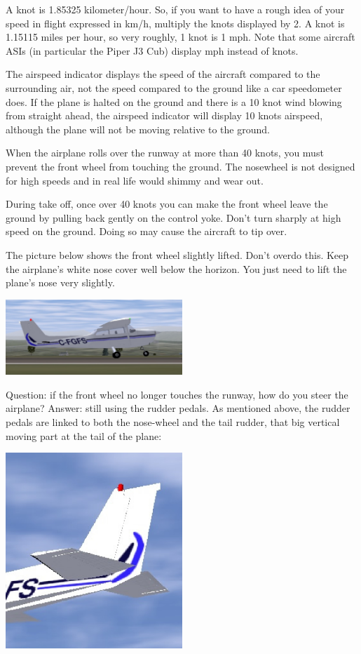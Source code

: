 A knot is 1.85325
kilometer/hour. So, if you want to have a rough idea of your speed in
flight expressed in km/h, multiply the knots displayed by 2. A knot is
1.15115 miles per hour, so very roughly, 1 knot is 1 mph. Note that some
aircraft ASIs (in particular the Piper J3 Cub) display mph instead of knots.

The airspeed indicator displays the speed of the aircraft compared
to the surrounding air, not the speed compared to the ground like a car
speedometer does. If the plane is halted on the ground and there is
a 10 knot wind blowing from straight ahead, the airspeed indicator will
display 10 knots airspeed, although the plane will not be moving relative to
the ground.

When the airplane rolls over the runway at more than 40 knots, you must
prevent the front wheel from touching the ground. The nosewheel is not designed
for high speeds and in real life would shimmy and wear out.

During take off, once over 40 knots you can make the front wheel leave the ground by pulling back
gently on the control yoke. Don't turn sharply at high speed on the ground. 
Doing so may cause the aircraft to tip over. 

The picture below shows the front wheel slightly lifted. Don't overdo
this. Keep the airplane's white nose cover well below the horizon. You
just need to lift the plane's nose very slightly.

\begin{center}
\includegraphics[width=0.5\textwidth]{img/tut_25}
\end{center}

Question: if the front wheel no longer touches the runway, how do you
steer the airplane? Answer: still using the rudder pedals. As mentioned above, 
the rudder pedals are linked to both the nose-wheel and the tail rudder, that 
big vertical moving part at the tail of the plane:

\begin{center}
\includegraphics[width=0.5\textwidth]{img/tut_26}
\end{center}

